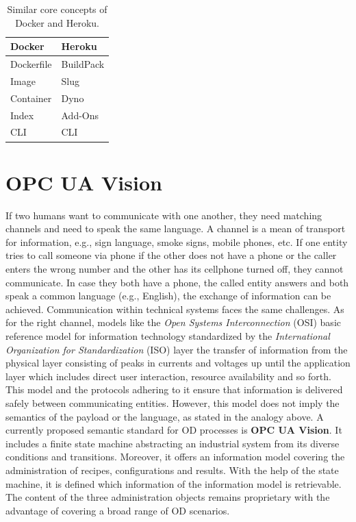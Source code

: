 \begin{table}
\begin{center}
      \caption[Similar core concepts of Docker and Heroku]{Similar core concepts of Docker and Heroku. \cite{Thurig2014Docker2018}}
  \begin{tabular}{ l | l }
    Docker & Heroku  \\ \hline
Dockerfile &	BuildPack \\ 
Image	& Slug\\ 
Container&	Dyno\\ 
Index	&Add-Ons\\ 
CLI	&CLI
  \end{tabular}
  \label{dockerandheroku}
\end{center}
\end{table}

\section{OPC UA Vision}
If two humans want to communicate with one another, they need matching channels and need to speak the same language. A channel is a mean of transport for information, e.g., sign language, smoke signs, mobile phones, etc. If one entity tries to call someone via phone if the other does not have a phone or the caller enters the wrong number and the other has its cellphone turned off, they cannot communicate. In case they both have a phone, the called entity answers and both speak a common language (e.g., English), the exchange of information can be achieved. Communication within technical systems faces the same challenges. As for the right channel, models like the \textit{Open Systems Interconnection} (OSI) basic reference model for information technology standardized by the \textit{International Organization for Standardization} (ISO) layer the transfer of information from the physical layer consisting of peaks in currents and voltages up until the application layer which includes direct user interaction, resource availability and so forth.~\cite{InternationalOrganizationForStandardization1996ISO/IECEd.} This model and the protocols adhering to it ensure that information is delivered safely between communicating entities. However, this model does not imply the semantics of the payload or the language, as stated in the analogy above. A currently proposed semantic standard for OD processes is \textbf{OPC UA Vision}. It includes a finite state machine abstracting an industrial system from its diverse conditions and transitions. Moreover, it offers an information model covering the administration of recipes, configurations and results. With the help of the state machine, it is defined which information of the information model is retrievable. The content of the three administration objects remains proprietary with the advantage of covering a broad range of OD scenarios.

